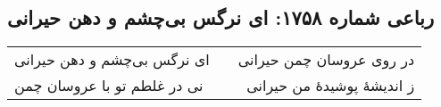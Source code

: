 \begin{center}
\section*{رباعی شماره ۱۷۵۸: ای نرگس بی‌چشم و دهن حیرانی}
\label{sec:1758}
\begin{longtable}{l p{0.5cm} r}
ای نرگس بی‌چشم و دهن حیرانی
&&
در روی عروسان چمن حیرانی
\\
نی در غلطم تو با عروسان چمن
&&
ز اندیشهٔ پوشیدهٔ من حیرانی
\\
\end{longtable}
\end{center}
